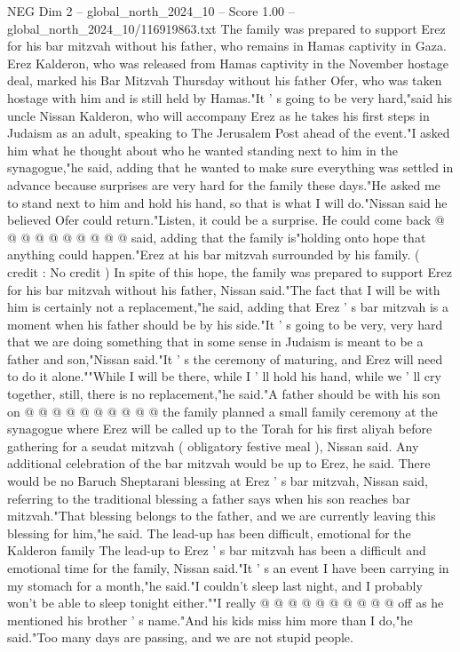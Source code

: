 \begin{textsample}{NEG Dim 2 – global\_north\_2024\_10 – Score 1.00 – global\_north\_2024\_10/116919863.txt}  \label{ex:f2_neg_101}
The family was prepared to support Erez for his bar mitzvah without his father, who remains in Hamas captivity in Gaza.
Erez Kalderon, who was released from Hamas captivity in the November hostage deal, marked his Bar Mitzvah Thursday without his father Ofer, who was taken hostage with him and is still held by Hamas."It ' s going to be very hard,"said his uncle Nissan Kalderon, who will accompany Erez as he takes his first steps in Judaism as an adult, speaking to The Jerusalem Post ahead of the event."I asked him what he thought about who he wanted standing next to him in the synagogue,"he said, adding that he wanted to make sure everything was settled in advance because surprises are very hard for the family these days."He asked me to stand next to him and hold his hand, so that is what I will do."Nissan said he believed Ofer could return."Listen, it could be a surprise.
He could come back @ @ @ @ @ @ @ @ @ @ said, adding that the family is"holding onto hope that anything could happen."Erez at his bar mitzvah surrounded by his family. ( credit : No credit ) In spite of this hope, the family was prepared to support Erez for his bar mitzvah without his father, Nissan said."The fact that I will be with him is certainly not a replacement,"he said, adding that Erez ' s bar mitzvah is a moment when his father should be by his side."It ' s going to be very, very hard that we are doing something that in some sense in Judaism is meant to be a father and son,"Nissan said."It ' s the ceremony of maturing, and Erez will need to do it alone.""While I will be there, while I ' ll hold his hand, while we ' ll cry together, still, there is no replacement,"he said."A father should be with his son on @ @ @ @ @ @ @ @ @ @ the family planned a small family ceremony at the synagogue where Erez will be called up to the Torah for his first aliyah before gathering for a seudat mitzvah ( obligatory festive meal ), Nissan said.
Any additional celebration of the bar mitzvah would be up to Erez, he said.
There would be no Baruch Sheptarani blessing at Erez ' s bar mitzvah, Nissan said, referring to the traditional blessing a father says when his son reaches bar mitzvah."That blessing belongs to the father, and we are currently leaving this blessing for him,"he said.
The lead-up has been difficult, emotional for the Kalderon family The lead-up to Erez ' s bar mitzvah has been a difficult and emotional time for the family, Nissan said."It ' s an event I have been carrying in my stomach for a month,"he said."I couldn't sleep last night, and I probably won't be able to sleep tonight either.""I really @ @ @ @ @ @ @ @ @ @ off as he mentioned his brother ' s name."And his kids miss him more than I do,"he said."Too many days are passing, and we are not stupid people.

\end{textsample}
